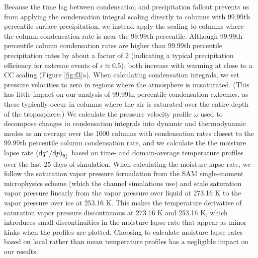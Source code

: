 \documentclass[twocol]{ametsoc}
\begin{document}
Because the time lag between condensation and precipitation fallout prevents us from applying the condensation integral scaling directly to columns with 99.99th percentile surface precipitation, we instead apply the scaling to columns where the column condensation rate is near the 99.99th percentile. Although 99.99th percentile column condensation rates are higher than 99.99th percentile precipitation rates by about a factor of 2 (indicating a typical precipitation efficiency for extreme events of $\epsilon \approx 0.5$), both increase with warming at close to a CC scaling (Figure \ref{fig:f3}a). When calculating condensation integrals, we set pressure velocities to zero in regions where the atmosphere is unsaturated. (This has little impact on our analysis of 99.99th percentile condensation extremes, as these typically occur in columns where the air is saturated over the entire depth of the troposphere.) We calculate the pressure velocity profile $\omega$ used to decompose changes in condensation integrals into dynamic and thermodynamic modes as an average over the 1000 columns with condensation rates closest to the 99.99th percentile column condensation rate, and we calculate the the moisture lapse rate $\left({\rm d}q^*/{\rm d}p\right)_{\theta_e^*}$ based on time- and domain-average temperature profiles over the last 25 days of simulation. When calculating the moisture lapse rate, we follow the saturation vapor pressure formulation from the SAM single-moment microphysics scheme \citep{Khairoutdinov2003CloudSensitivities} (which the channel simulations use) and scale saturation vapor pressure linearly from the vapor pressure over liquid at 273.16 K to the vapor pressure over ice at 253.16 K. This makes the temperature derivative of saturation vapor pressure discontinuous at 273.16 K and 253.16 K, which introduces small discontinuities in the moisture lapse rate that appear as minor kinks when the profiles are plotted. Choosing to calculate moisture lapse rates based on local rather than mean temperature profiles has a negligible impact on our results.
\end{document}
